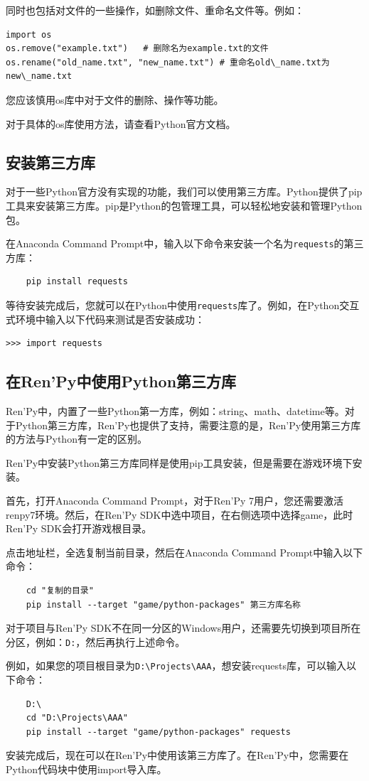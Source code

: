\documentclass[../../Main.tex]{subfiles}
\begin{document}
同时也包括对文件的一些操作，如删除文件、重命名文件等。例如：

\begin{lstlisting}
import os
os.remove("example.txt")   # 删除名为example.txt的文件
os.rename("old_name.txt", "new_name.txt") # 重命名old\_name.txt为new\_name.txt
\end{lstlisting}

\begin{Attention}
    您应该慎用os库中对于文件的删除、操作等功能。
\end{Attention}

对于具体的os库使用方法，请查看Python官方文档。

\subsection{安装第三方库}
对于一些Python官方没有实现的功能，我们可以使用第三方库。Python提供了pip工具来安装第三方库。pip是Python的包管理工具，可以轻松地安装和管理Python包。

在Anaconda Command Prompt中，输入以下命令来安装一个名为\verb|requests|的第三方库：
\begin{verbatim}
    pip install requests
\end{verbatim}

等待安装完成后，您就可以在Python中使用\verb|requests|库了。例如，在Python交互式环境中输入以下代码来测试是否安装成功：
\begin{verbatim}
>>> import requests
\end{verbatim}

\subsection{在Ren'Py中使用Python第三方库}

Ren'Py中，内置了一些Python第一方库，例如：string、math、datetime等。对于Python第三方库，Ren'Py也提供了支持，需要注意的是，Ren'Py使用第三方库的方法与Python有一定的区别。

Ren'Py中安装Python第三方库同样是使用pip工具安装，但是需要在游戏环境下安装。

首先，打开Anaconda Command Prompt，对于Ren'Py 7用户，您还需要激活renpy7环境。然后，在Ren'Py SDK中选中项目，在右侧选项中选择game，此时Ren'Py SDK会打开游戏根目录。

点击地址栏，全选复制当前目录，然后在Anaconda Command Prompt中输入以下命令：
\begin{verbatim}
    cd "复制的目录"
    pip install --target "game/python-packages" 第三方库名称
\end{verbatim}

对于项目与Ren'Py SDK不在同一分区的Windows用户，还需要先切换到项目所在分区，例如：\verb|D:|，然后再执行上述命令。

例如，如果您的项目根目录为\verb|D:\Projects\AAA|，想安装requests库，可以输入以下命令：
\begin{verbatim}
    D:\
    cd "D:\Projects\AAA"
    pip install --target "game/python-packages" requests
\end{verbatim}

安装完成后，现在可以在Ren'Py中使用该第三方库了。在Ren'Py中，您需要在Python代码块中使用import导入库。
\end{document}
